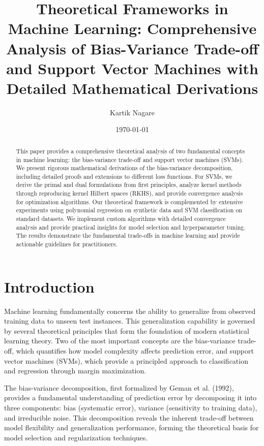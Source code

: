 \documentclass[12pt, a4paper]{article}
\title{Theoretical Frameworks in Machine Learning: Comprehensive Analysis of Bias-Variance Trade-off and Support Vector Machines with Detailed Mathematical Derivations}
\author{Kartik Nagare}
\date{\today}
\begin{document}
\maketitle

\begin{abstract}
This paper provides a comprehensive theoretical analysis of two fundamental concepts in machine learning: the bias-variance trade-off and support vector machines (SVMs). We present rigorous mathematical derivations of the bias-variance decomposition, including detailed proofs and extensions to different loss functions. For SVMs, we derive the primal and dual formulations from first principles, analyze kernel methods through reproducing kernel Hilbert spaces (RKHS), and provide convergence analysis for optimization algorithms. Our theoretical framework is complemented by extensive experiments using polynomial regression on synthetic data and SVM classification on standard datasets. We implement custom algorithms with detailed convergence analysis and provide practical insights for model selection and hyperparameter tuning. The results demonstrate the fundamental trade-offs in machine learning and provide actionable guidelines for practitioners.
\end{abstract}

\section{Introduction}

Machine learning fundamentally concerns the ability to generalize from observed training data to unseen test instances. This generalization capability is governed by several theoretical principles that form the foundation of modern statistical learning theory. Two of the most important concepts are the bias-variance trade-off, which quantifies how model complexity affects prediction error, and support vector machines (SVMs), which provide a principled approach to classification and regression through margin maximization.

The bias-variance decomposition, first formalized by Geman et al. (1992), provides a fundamental understanding of prediction error by decomposing it into three components: bias (systematic error), variance (sensitivity to training data), and irreducible noise. This decomposition reveals the inherent trade-off between model flexibility and generalization performance, forming the theoretical basis for model selection and regularization techniques.
\end{document}
